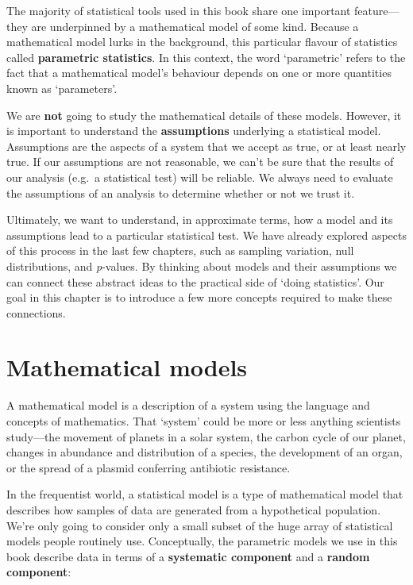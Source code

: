 \documentclass[
]{book}
\begin{document}
The majority of statistical tools used in this book share one important feature---they are underpinned by a mathematical model of some kind. Because a mathematical model lurks in the background, this particular flavour of statistics called \textbf{parametric statistics}. In this context, the word `parametric' refers to the fact that a mathematical model's behaviour depends on one or more quantities known as `parameters'.

We are \textbf{not} going to study the mathematical details of these models. However, it is important to understand the \textbf{assumptions} underlying a statistical model. Assumptions are the aspects of a system that we accept as true, or at least nearly true. If our assumptions are not reasonable, we can't be sure that the results of our analysis (e.g.~a statistical test) will be reliable. We always need to evaluate the assumptions of an analysis to determine whether or not we trust it.

Ultimately, we want to understand, in approximate terms, how a model and its assumptions lead to a particular statistical test. We have already explored aspects of this process in the last few chapters, such as sampling variation, null distributions, and \emph{p}-values. By thinking about models and their assumptions we can connect these abstract ideas to the practical side of `doing statistics'. Our goal in this chapter is to introduce a few more concepts required to make these connections.

\hypertarget{math-models}{%
\section{Mathematical models}\label{math-models}}

A mathematical model is a description of a system using the language and concepts of mathematics. That `system' could be more or less anything scientists study---the movement of planets in a solar system, the carbon cycle of our planet, changes in abundance and distribution of a species, the development of an organ, or the spread of a plasmid conferring antibiotic resistance.

In the frequentist world, a statistical model is a type of mathematical model that describes how samples of data are generated from a hypothetical population. We're only going to consider only a small subset of the huge array of statistical models people routinely use. Conceptually, the parametric models we use in this book describe data in terms of a \textbf{systematic component} and a \textbf{random component}:
\end{document}
